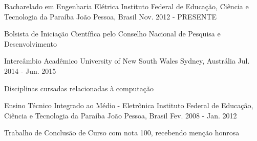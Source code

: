 

\begin{cventries}

  \cventry
    {Bacharelado em Engenharia Elétrica} %
    {Instituto Federal de Educação, Ciência e Tecnologia da Paraíba} %
    {João Pessoa, Brasil} %
    {Nov. 2012 - PRESENTE} %
    {
	\begin{cvitems} %
		\item {Bolsista de Iniciação Científica pelo Conselho Nacional de Pesquisa e Desenvolvimento}
	\end{cvitems}
    }

    \cventry
    {Intercâmbio Acadêmico} %
    {University of New South Wales} %
    {Sydney, Austrália} %
    {Jul. 2014 - Jun. 2015} %
    {
		\begin{cvitems} %
        	\item {Disciplinas cursadas relacionadas à computação}
        \end{cvitems}
    }

    \cventry
    {Ensino Técnico Integrado ao Médio - Eletrônica}
    {Instituto Federal de Educação, Ciência e Tecnologia da Paraíba}
    {João Pessoa, Brasil}
    {Fev. 2008 - Jan. 2012}
    {
		\begin{cvitems}
        \item {Trabalho de Conclusão de Curso com nota 100, recebendo menção honrosa}
        \end{cvitems}
    }

\end{cventries}
